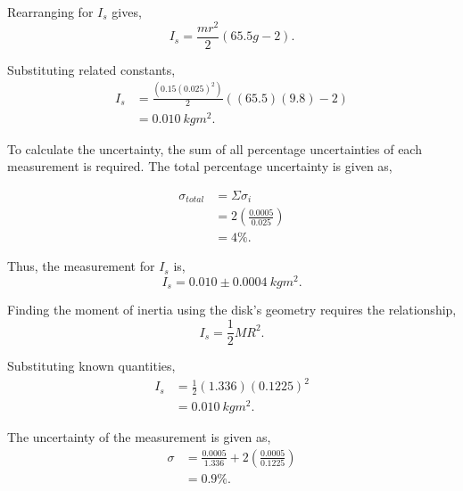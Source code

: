 \documentclass{article}
\begin{document}
Rearranging for $I_s$ gives,
\begin{equation}
    I_s = \frac{mr^2}{2}(65.5g-2).
\end{equation}

Substituting related constants, 
\begin{equation}
    \begin{split}
    I_s &= \frac{(0.15(0.025)^2)}{2}((65.5)(9.8)-2) \\
    &= 0.010 \: kgm^2.
    \end{split}
\end{equation}

To calculate the uncertainty, the sum of all percentage uncertainties of each measurement 
is required. The total percentage uncertainty is given as,

\begin{equation}
    \begin{split}
    \sigma_{total} &= \Sigma \sigma_i \\ 
    &= 2(\frac{0.0005}{0.025}) \\
    &= 4\%.   
    \end{split}
\end{equation}

Thus, the measurement for $I_s$ is,
\begin{equation}
    I_s = 0.010 \pm 0.0004 \: kgm^2.
\end{equation}

Finding the moment of inertia using the disk's geometry requires the relationship,
\begin{equation}
    I_s = \frac{1}{2}MR^2.
\end{equation}

Substituting known quantities,
\begin{equation}
    \begin{split}
        I_s &= \frac{1}{2}(1.336)(0.1225)^2 \\
        &= 0.010 \: kgm^2.
    \end{split}
\end{equation}

The uncertainty of the measurement is given as,
\begin{equation}
    \begin{split}
        \sigma &= \frac{0.0005}{1.336}+2(\frac{0.0005}{0.1225}) \\
        &=0.9\%.
    \end{split}
\end{equation}
\end{document}
